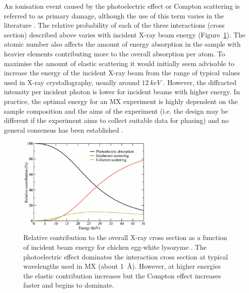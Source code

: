         An ionisation event caused by the photoelectric effect or Compton scattering is referred to as primary damage, although the use of this term varies in the literature \cite{garman2010}.
        The relative probability of each of the three interactions (cross section) described above varies with incident X-ray beam energy (Figure~\ref{fig:Relative Absorption Probabilities}). The atomic number also affects the amount of energy absorption in the sample with heavier elements contributing more to the overall absorption per atom.
        To maximise the amount of elastic scattering it would initially seem advisable to increase the energy of the incident X-ray beam from the range of typical values used in X-ray crystallography, usually around $12\ keV$ \cite{pait2010}.
        However, the diffracted intensity per incident photon is lower for incident beams with higher energy. In practice, the optimal energy for an MX experiment is highly dependent on the sample composition and the aims of the experiment (i.e. the design may be different if the experiment aims to collect suitable data for phasing) and no general consensus has been established \cite{pait2010}.
        \begin{figure}
            \centering
            \includegraphics[width=0.6\textwidth]{figures/introduction/relativeinteractions.png}
            \caption{Relative contribution to the overall X-ray cross section as a function of incident beam energy for chicken egg-white lysozyme \cite{pait2010}. The photoelectric effect dominates the interaction cross section at typical wavelengths used in MX (about 1\ \AA). However, at higher energies the elastic contribution increases but the Compton effect increases faster and begins to dominate.}
            \label{fig:Relative Absorption Probabilities}
        \end{figure}

